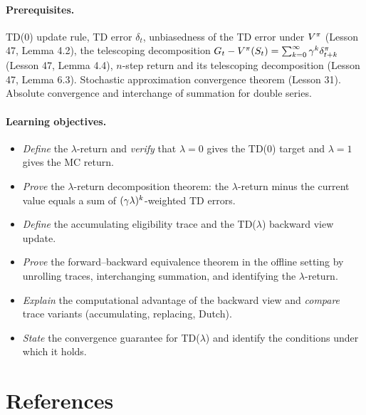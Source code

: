 \documentclass[11pt,a4paper]{article}
\begin{document}
\paragraph{Prerequisites.}
TD(0) update rule, TD error $\delta_t$, unbiasedness of the TD error
under $V^{\pi}$ (Lesson 47, Lemma 4.2), the telescoping decomposition
$G_t - V^{\pi}(S_t) = \sum_{k=0}^\infty \gamma^k
\delta_{t+k}^\pi$ (Lesson 47, Lemma 4.4), $n$-step return and its
telescoping decomposition (Lesson 47, Lemma 6.3). Stochastic
approximation convergence theorem (Lesson 31). Absolute convergence
and interchange of summation for double series.

\paragraph{Learning objectives.}
\begin{itemize}
  \item \emph{Define} the $\lambda$-return and \emph{verify} that
    $\lambda = 0$ gives the TD(0) target and $\lambda = 1$ gives the
    MC return.
  \item \emph{Prove} the $\lambda$-return decomposition theorem: the
    $\lambda$-return minus the current value equals a sum of
    $(\gamma\lambda)^k$-weighted TD errors.
  \item \emph{Define} the accumulating eligibility trace and the
    TD($\lambda$) backward view update.
  \item \emph{Prove} the forward--backward equivalence theorem in the
    offline setting by unrolling traces, interchanging summation, and
    identifying the $\lambda$-return.
  \item \emph{Explain} the computational advantage of the backward view
    and \emph{compare} trace variants (accumulating, replacing, Dutch).
  \item \emph{State} the convergence guarantee for TD($\lambda$) and
    identify the conditions under which it holds.
\end{itemize}

\section{References}
\label{sec:references}
\end{document}
